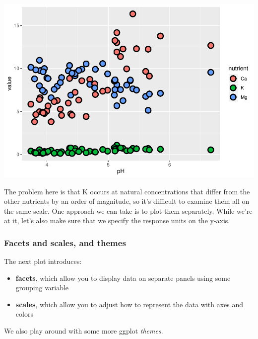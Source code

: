 \documentclass[
]{article}
\begin{document}
\includegraphics{module1_3_files/figure-latex/unnamed-chunk-31-1.pdf}

The problem here is that K occurs at natural concentrations that differ
from the other nutrients by an order of magnitude, so it's difficult to
examine them all on the same scale. One approach we can take is to plot
them separately. While we're at it, let's also make sure that we specify
the response units on the y-axis.

\hypertarget{facets-and-scales-and-themes}{%
\subsubsection{Facets and scales, and
themes}\label{facets-and-scales-and-themes}}

The next plot introduces:

\begin{itemize}
\item
  \textbf{facets}, which allow you to display data on separate panels
  using some grouping variable
\item
  \textbf{scales}, which allow you to adjust how to represent the data
  with axes and colors
\end{itemize}

We also play around with some more ggplot \emph{themes}.
\end{document}
